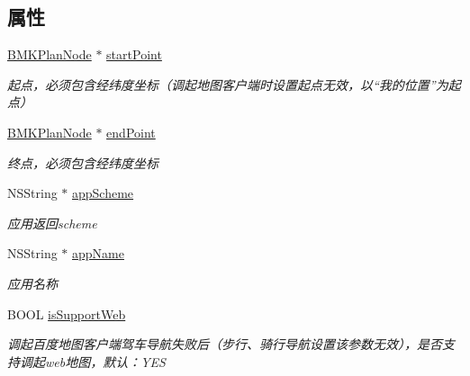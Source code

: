 \subsection*{属性}
\begin{DoxyCompactItemize}
\item 
\hypertarget{interface_b_m_k_navi_para_aafbed621fc51d1fe9a24b007f06635fb}{}\hyperlink{interface_b_m_k_plan_node}{B\+M\+K\+Plan\+Node} $\ast$ \hyperlink{interface_b_m_k_navi_para_aafbed621fc51d1fe9a24b007f06635fb}{start\+Point}\label{interface_b_m_k_navi_para_aafbed621fc51d1fe9a24b007f06635fb}

\begin{DoxyCompactList}\small\item\em 起点，必须包含经纬度坐标（调起地图客户端时设置起点无效，以“我的位置”为起点） \end{DoxyCompactList}\item 
\hypertarget{interface_b_m_k_navi_para_a6c47b9b500a1361c81843dde65b79928}{}\hyperlink{interface_b_m_k_plan_node}{B\+M\+K\+Plan\+Node} $\ast$ \hyperlink{interface_b_m_k_navi_para_a6c47b9b500a1361c81843dde65b79928}{end\+Point}\label{interface_b_m_k_navi_para_a6c47b9b500a1361c81843dde65b79928}

\begin{DoxyCompactList}\small\item\em 终点，必须包含经纬度坐标 \end{DoxyCompactList}\item 
\hypertarget{interface_b_m_k_navi_para_aa6d336d0e092b0624c49cacf73141bee}{}N\+S\+String $\ast$ \hyperlink{interface_b_m_k_navi_para_aa6d336d0e092b0624c49cacf73141bee}{app\+Scheme}\label{interface_b_m_k_navi_para_aa6d336d0e092b0624c49cacf73141bee}

\begin{DoxyCompactList}\small\item\em 应用返回scheme \end{DoxyCompactList}\item 
\hypertarget{interface_b_m_k_navi_para_a4c98f8aca9d18fd287e345aaffff4f1c}{}N\+S\+String $\ast$ \hyperlink{interface_b_m_k_navi_para_a4c98f8aca9d18fd287e345aaffff4f1c}{app\+Name}\label{interface_b_m_k_navi_para_a4c98f8aca9d18fd287e345aaffff4f1c}

\begin{DoxyCompactList}\small\item\em 应用名称 \end{DoxyCompactList}\item 
\hypertarget{interface_b_m_k_navi_para_a6c6138ab343647778afd21a6fb42c685}{}B\+O\+O\+L \hyperlink{interface_b_m_k_navi_para_a6c6138ab343647778afd21a6fb42c685}{is\+Support\+Web}\label{interface_b_m_k_navi_para_a6c6138ab343647778afd21a6fb42c685}

\begin{DoxyCompactList}\small\item\em 调起百度地图客户端驾车导航失败后（步行、骑行导航设置该参数无效），是否支持调起web地图，默认：\+Y\+E\+S \end{DoxyCompactList}\end{DoxyCompactItemize}


